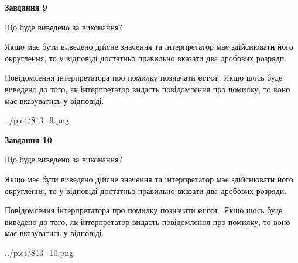 \documentclass[12pt, ukrainian]{article}
\begin{document}
{\begin {Large}
{\begin {center}\textbf{Завдання 9}\end {center}}\par
Що буде виведено за виконання? \par

Якщо має бути виведено дійсне значення та інтерпретатор має здійснювати його округлення, 
то у відповіді достатньо правильно вказати два дробових розряди.

Повідомлення інтерпретатора про помилку позначати \textbf{error}.
Якщо щось буде виведено до того, як інтерпретатор видасть повідомлення про помилку, 
то воно має вказуватись у відповіді. \par

\begin{center}
	{../pict/813_9.png}
\end{center}
\newpage

{\begin {center}\textbf{Завдання 10}\end {center}}\par
Що буде виведено за виконання? \par

Якщо має бути виведено дійсне значення та інтерпретатор має здійснювати його округлення, 
то у відповіді достатньо правильно вказати два дробових розряди.

Повідомлення інтерпретатора про помилку позначати \textbf{error}.
Якщо щось буде виведено до того, як інтерпретатор видасть повідомлення про помилку, 
то воно має вказуватись у відповіді. \par

\begin{center}
	{../pict/813_10.png}
\end{center}
\newpage

\end {Large}}
\end{document}
